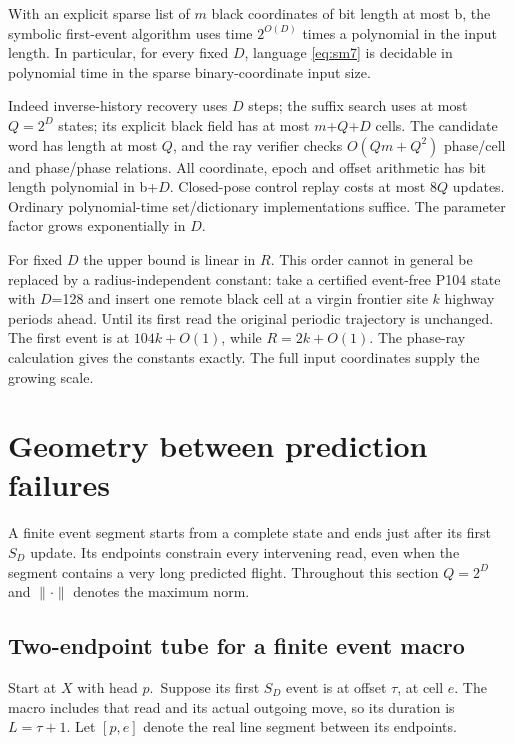 \documentclass[
  11pt,
]{article}
\begin{document}
With an explicit sparse list of \(m\) black coordinates of bit length at
most b, the symbolic first-event algorithm uses time $2^{O(D)}$ times
a polynomial in the input length. In particular, for every fixed \(D\),
language \eqref{eq:sm7} is decidable in polynomial time in the sparse
binary-coordinate input size.

Indeed inverse-history recovery uses \(D\) steps; the suffix search uses at
most $Q=2^D$ states; its explicit black field has at most \(m\)+\(Q\)+\(D\) cells.
The candidate word has length at most \(Q\), and the ray verifier checks
$O(Qm+Q^2)$ phase/cell and phase/phase relations. All coordinate,
epoch and offset arithmetic has bit length polynomial in b+\(D\).
Closed-pose control replay costs at most \(8Q\) updates. Ordinary
polynomial-time set/dictionary implementations suffice. The parameter
factor grows exponentially in \(D\).

For fixed \(D\) the upper bound is linear in \(R\). This order cannot in general
be replaced by a radius-independent constant: take a certified
event-free P104 state with \(D\)=128 and insert one remote black cell at a
virgin frontier site \(k\) highway periods ahead. Until its first read the
original periodic trajectory is unchanged. The first event is at
\(104k+O(1)\), while \(R=2k+O(1)\). The phase-ray calculation gives the
constants exactly. The full input coordinates supply the growing scale.

\section{Geometry between prediction failures}\label{sec:endpoint-tube}
A finite event segment starts from a complete state and ends just after its
first $S_D$ update. Its endpoints constrain every intervening read, even
when the segment contains a very long predicted flight. Throughout this
section $Q=2^D$ and $\|\cdot\|$ denotes the maximum norm.

\subsection{Two-endpoint tube for a finite event macro}\label{remote-2}

Start at \(X\) with head \(p\).~Suppose its first $S_D$ event is at offset \(\tau\),
at cell \(e\). The macro includes that read and its actual outgoing move, so
its duration is \(L=\tau+1\). Let \([p,e]\) denote the real line segment
between its endpoints.
\end{document}

